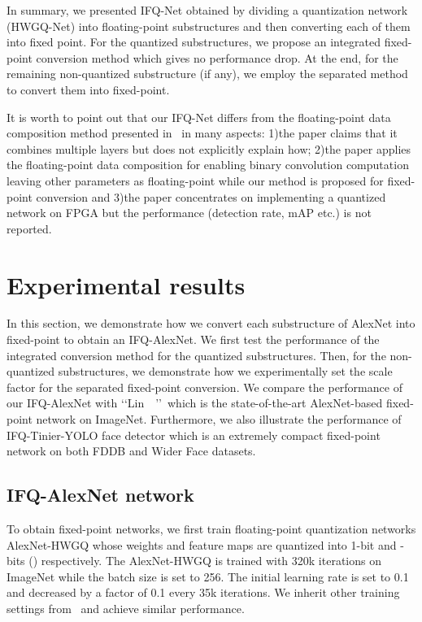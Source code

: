 \documentclass[10pt,twocolumn,letterpaper]{article}
\begin{document}
In summary, we presented IFQ-Net obtained by dividing a quantization network (\eg HWGQ-Net) into floating-point substructures and then converting each of them into fixed point. For the quantized substructures, we propose an integrated fixed-point conversion method which gives no performance drop. At the end, for the remaining non-quantized substructure (if any), we employ the separated method to convert them into fixed-point.



It is worth to point out that our IFQ-Net differs from the floating-point data composition method presented in~\cite{LayerMerge} in many aspects: 1)the paper claims that it combines multiple layers but does not explicitly explain how; 2)the paper applies the floating-point data composition for enabling binary convolution computation leaving other parameters as floating-point while our method is proposed for fixed-point conversion and 3)the paper concentrates on implementing a quantized network on FPGA but the performance (\eg detection rate, mAP etc.) is not reported.

\section{Experimental results}

In this section, we demonstrate how we convert each substructure of AlexNet into fixed-point to obtain an IFQ-AlexNet. We first test the performance of the integrated conversion method for the quantized substructures. Then, for the non-quantized substructures, we demonstrate how we experimentally set the scale factor  for the separated fixed-point conversion. We compare the performance of our IFQ-AlexNet with \lq\lq Lin~\etal~\cite{LinFixPoint}\rq\rq\, which is the state-of-the-art AlexNet-based fixed-point network on ImageNet. Furthermore, we also illustrate the performance of IFQ-Tinier-YOLO face detector which is an extremely compact fixed-point network on both FDDB and Wider Face datasets.



\subsection{IFQ-AlexNet network}

To obtain fixed-point networks, we first train floating-point quantization networks AlexNet-HWGQ whose weights and feature maps are quantized into 1-bit and -bits () respectively. The AlexNet-HWGQ is trained with 320k iterations on ImageNet while the batch size is set to 256. The initial learning rate is set to 0.1 and decreased by a factor of 0.1 every 35k iterations. We inherit other training settings from~\cite{HWGQ} and achieve similar performance.
\end{document}
